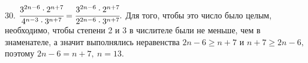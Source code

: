30. $\cfrac{3^{2n-6}\cdot2^{n+7}}{4^{n-3}\cdot3^{n+7}}=\cfrac{3^{2n-6}\cdot2^{n+7}}{2^{2n-6}\cdot3^{n+7}}.$ Для того, чтобы это число было целым, необходимо, чтобы степени 2 и 3 в числителе были не меньше, чем в знаменателе, а значит выполнялись неравенства $2n-6\geqslant n+7$ и $n+7\geqslant 2n-6,$ поэтому $2n-6=n+7,\ n=13.$\\
